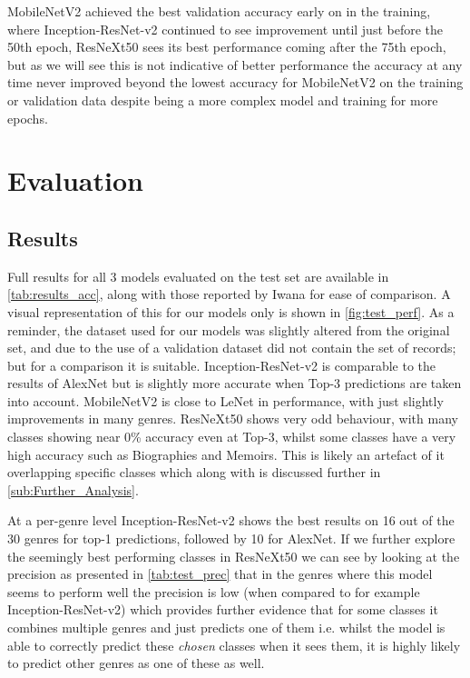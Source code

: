 \documentclass[12pt]{article}
\numberwithin{equation}{section}
\numberwithin{figure}{section}
\begin{document}
MobileNetV2 achieved the best validation accuracy early on in the training, where Inception-ResNet-v2 continued to see improvement until just before the 50th epoch, ResNeXt50 sees its best performance coming after the 75th epoch, but as we will see this is not indicative of better performance the accuracy at any time never improved beyond the lowest accuracy for MobileNetV2 on the training or validation data despite being a more complex model and training for more epochs.


\section{Evaluation} 
\label{sec:Evaluation_and_Further_Exploration} 
\subsection{Results} 
\label{sub:Results} 
Full results for all 3 models evaluated on the test set are available in \cref{tab:results_acc}, along with those reported by Iwana for ease of comparison. A visual representation of this for our models only is shown in \cref{fig:test_perf}. As a reminder, the dataset used for our models was slightly altered from the original set, and due to the use of a validation dataset did not contain the set of records; but for a comparison it is suitable. Inception-ResNet-v2 is comparable to the results of AlexNet but is slightly more accurate when Top-3 predictions are taken into account. MobileNetV2 is close to LeNet in performance, with just slightly improvements in many genres. ResNeXt50 shows very odd behaviour, with many classes showing near 0\% accuracy even at Top-3, whilst some classes have a very high accuracy such as Biographies and Memoirs. This is likely an artefact of it overlapping specific classes which along with is discussed further in \cref{sub:Further_Analysis}.

At a per-genre level Inception-ResNet-v2 shows the best results on 16 out of the 30 genres for top-1 predictions, followed by 10 for AlexNet. If we further explore the seemingly best performing classes in ResNeXt50 we can see by looking at the precision as presented in \cref{tab:test_prec} that in the genres where this model seems to perform well the precision is low (when compared to for example Inception-ResNet-v2) which provides further evidence that for some classes it combines multiple genres and just predicts one of them i.e. whilst the model is able to correctly predict these \emph{chosen}	classes when it sees them, it is highly likely to predict other genres as one of these as well.
\end{document}
